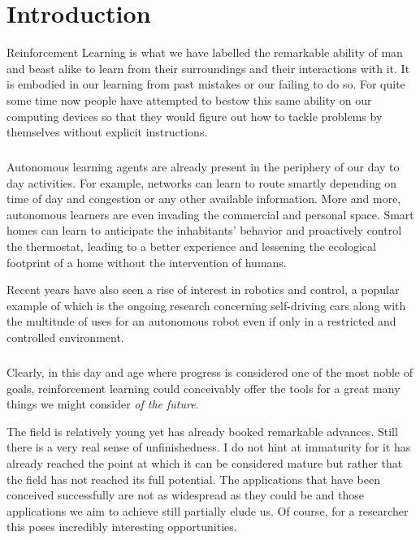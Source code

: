 \chapter{Introduction}

\label{introduction}
Reinforcement Learning is what we have labelled the remarkable ability of man and beast alike
to learn from their surroundings and their interactions with it.
It is embodied in our learning from past mistakes or our failing to do so.
For quite some time now people have attempted to bestow this same ability on
our computing devices so that they would figure out how to tackle problems by themselves
without explicit instructions.

\paragraph{}
Autonomous learning agents are already present
in the periphery of our day to day activities.
For example,
networks can learn to route smartly
depending on time of day
and congestion
or any other available information.
More and more,
autonomous learners are even invading
the commercial and personal space.
Smart homes can learn to anticipate the inhabitants'
behavior and proactively control the thermostat,
leading to a better experience
and lessening the ecological footprint of a home
without the intervention of humans.

Recent years have also seen a rise of interest
in robotics and control,
a popular example of which is the ongoing research
concerning self-driving cars
along with the multitude of uses for an autonomous robot
even if only in a restricted and controlled environment.

\paragraph{}
Clearly,
in this day and age
where progress is considered
one of the most noble of goals,
reinforcement learning could conceivably
offer the tools
for a great many things
we might consider \textit{of the future}.

The field is relatively young
yet has already booked remarkable advances.
Still there is a very real sense of unfinishedness.
I do not hint at immaturity
for it has already reached the point
at which it can be considered mature
but rather that the field has not reached its full potential.
The applications that have been conceived successfully
are not as widespread as they could be
and those applications we aim to achieve
still partially elude us.
Of course, for a researcher
this poses incredibly interesting opportunities.

